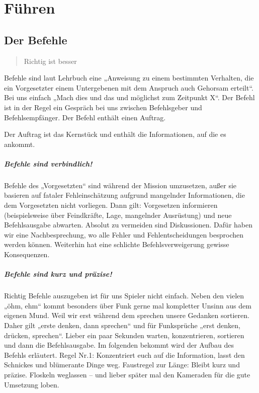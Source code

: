 \chapter{Führen}
\section{Der Befehle}
\label{subsec:befehl}
\begin{quote}
	\glqq Richtig ist besser\grqq
\end{quote}
Befehle sind laut Lehrbuch eine „Anweisung zu einem bestimmten Verhalten, die ein Vorgesetzter einem Untergebenen mit dem Anspruch auch Gehorsam erteilt“. Bei uns einfach „Mach dies und das und möglichst zum Zeitpunkt X“. Der Befehl ist in der Regel ein Gespräch bei uns zwischen Befehlsgeber und Befehlsempfänger. Der Befehl enthält einen Auftrag.\par
Der Auftrag ist das Kernstück und enthält die Informationen, auf die es ankommt.

\paragraph*{Befehle sind verbindlich!}
Befehle des „Vorgesetzten“ sind während der Mission umzusetzen, außer sie basieren auf fataler Fehleinschätzung aufgrund mangelnder Informationen, die dem Vorgesetzten nicht vorliegen. Dann gilt: Vorgesetzen informieren (beispielsweise über Feindkräfte, Lage, mangelnder Ausrüstung) und neue Befehlsausgabe abwarten. Absolut zu vermeiden sind Diskussionen. Dafür haben wir eine Nachbesprechung, wo alle Fehler und Fehlentscheidungen besprochen werden können. Weiterhin hat eine schlichte Befehlsverweigerung gewisse Konsequenzen.

\paragraph*{Befehle sind kurz und präzise!}
Richtig Befehle auszugeben ist für uns Spieler nicht einfach. 
Neben den vielen „öhm, ehm“ kommt besonders über Funk gerne mal kompletter Unsinn aus dem eigenen Mund. 
Weil wir erst während dem sprechen unsere Gedanken sortieren. 
Daher gilt „erste denken, dann sprechen“ und für Funksprüche „erst denken, drücken, sprechen“. Lieber ein paar Sekunden warten, konzentrieren, sortieren und dann die Befehlsausgabe.
Im folgenden bekommt wird der Aufbau des Befehls erläutert. Regel Nr.1: Konzentriert euch auf die Information, lasst den Schnickes und blümerante Dinge weg.
Faustregel zur Länge: Bleibt kurz und präzise. Floskeln weglassen -- und lieber später mal den Kameraden für die gute Umsetzung loben. 

